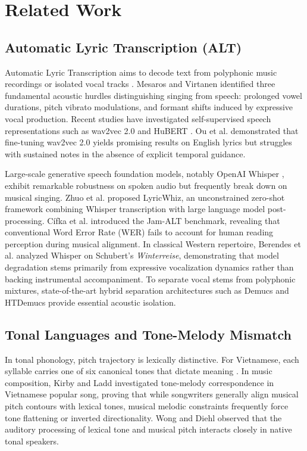\section{Related Work}
\subsection{Automatic Lyric Transcription (ALT)}
Automatic Lyric Transcription aims to decode text from polyphonic music recordings or isolated vocal tracks \cite{mesaros2010automatic,gupta2022deep}. Mesaros and Virtanen \cite{mesaros2010automatic} identified three fundamental acoustic hurdles distinguishing singing from speech: prolonged vowel durations, pitch vibrato modulations, and formant shifts induced by expressive vocal production. Recent studies have investigated self-supervised speech representations such as wav2vec 2.0 \cite{baevski2020wav2vec} and HuBERT \cite{hsu2021hubert}. Ou et al. \cite{ou2022transfer} demonstrated that fine-tuning wav2vec 2.0 yields promising results on English lyrics but struggles with sustained notes in the absence of explicit temporal guidance. 

Large-scale generative speech foundation models, notably OpenAI Whisper \cite{radford2023robust}, exhibit remarkable robustness on spoken audio but frequently break down on musical singing. Zhuo et al. \cite{zhuo2023lyricwhiz} proposed LyricWhiz, an unconstrained zero-shot framework combining Whisper transcription with large language model post-processing. C{\'i}fka et al. \cite{cifka2024jamalt} introduced the Jam-ALT benchmark, revealing that conventional Word Error Rate (WER) fails to account for human reading perception during musical alignment. In classical Western repertoire, Berendes et al. \cite{berendes2024lyrics} analyzed Whisper on Schubert's \textit{Winterreise}, demonstrating that model degradation stems primarily from expressive vocalization dynamics rather than backing instrumental accompaniment. To separate vocal stems from polyphonic mixtures, state-of-the-art hybrid separation architectures such as Demucs \cite{defossez2021hybrid} and HTDemucs \cite{rouard2023hybrid} provide essential acoustic isolation.

\subsection{Tonal Languages and Tone-Melody Mismatch}
In tonal phonology, pitch trajectory is lexically distinctive. For Vietnamese, each syllable carries one of six canonical tones that dictate meaning \cite{pham2003vietnamese,nguyen1997vietnamese,brunelle2009tone}. In music composition, Kirby and Ladd \cite{kirby2016tone} investigated tone-melody correspondence in Vietnamese popular song, proving that while songwriters generally align musical pitch contours with lexical tones, musical melodic constraints frequently force tone flattening or inverted directionality. Wong and Diehl \cite{wong2002how} observed that the auditory processing of lexical tone and musical pitch interacts closely in native tonal speakers.

